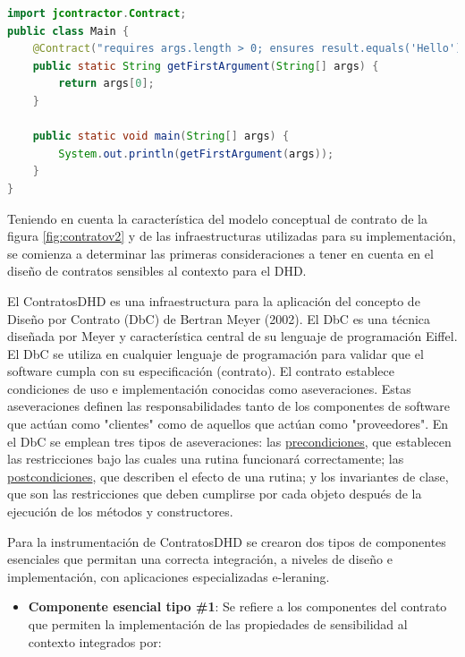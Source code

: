 \begin{itemize}
\begin{lstlisting}[language=Java]
import jcontractor.Contract;
public class Main {
    @Contract("requires args.length > 0; ensures result.equals('Hello');")
    public static String getFirstArgument(String[] args) {
        return args[0];
    }

    public static void main(String[] args) {
        System.out.println(getFirstArgument(args));
    }
}
\end{lstlisting}



Teniendo en cuenta la característica del modelo conceptual de contrato de la figura \ref{fig:contratov2} y de las infraestructuras utilizadas para su implementación, se comienza a determinar las primeras consideraciones a tener en cuenta en el diseño de contratos sensibles al contexto para el DHD.

\begin{defi} [ContratoDHD]

El ContratosDHD es una infraestructura para la aplicación del concepto de Diseño por Contrato (DbC) de Bertran Meyer (2002). El DbC es una técnica diseñada por Meyer y característica central de su lenguaje de programación Eiffel\cite{Meyer}. El DbC se utiliza en cualquier lenguaje de programación para validar que el software cumpla con su especificación (contrato). El contrato establece condiciones de uso e implementación conocidas como aseveraciones. Estas aseveraciones definen las responsabilidades tanto de los componentes de software que actúan como "clientes" como de aquellos que actúan como "proveedores". En el DbC se emplean tres tipos de aseveraciones: las \underline{precondiciones}, que establecen las restricciones bajo las cuales una rutina funcionará correctamente; las \underline{postcondiciones}, que describen el efecto de una rutina; y los invariantes de clase, que son las restricciones que deben cumplirse por cada objeto después de la ejecución de los métodos y constructores.
\end{defi} 


Para la instrumentación de ContratosDHD se crearon dos tipos de componentes esenciales que permitan una correcta integración, a niveles de diseño e implementación, con aplicaciones especializadas e-leraning. 


\begin{itemize} \label{CEC}

 \item \textbf{Componente esencial tipo \#1}: Se refiere a los componentes del contrato que permiten la implementación de las propiedades de sensibilidad al contexto integrados por:
 

\end{itemize}
\end{itemize}
